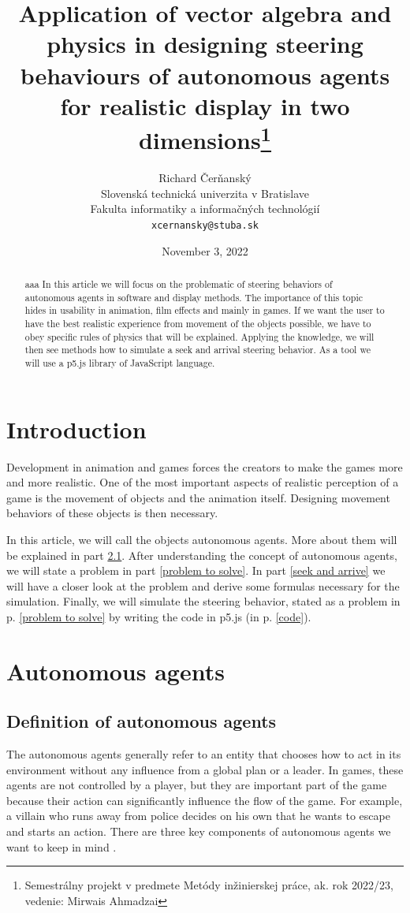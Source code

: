 \documentclass[10pt,twoside,english,a4paper]{article}
\title{Application of vector algebra and physics in designing steering behaviours of autonomous agents for realistic display in two dimensions\thanks{Semestrálny projekt v predmete Metódy inžinierskej práce, ak. rok 2022/23, vedenie: Mirwais Ahmadzai}}
\author{Richard Čerňanský\\[2pt]
	{\small Slovenská technická univerzita v Bratislave}\\
	{\small Fakulta informatiky a informačných technológií}\\
	{\small \texttt{xcernansky@stuba.sk}}
	}
\date{\small November 3, 2022 }
\begin{document}
\maketitle

\begin{abstract}
aaa
In this article we will focus on the problematic of steering behaviors of autonomous agents in software and display methods. The importance of this topic hides in usability in animation, film effects and mainly in games. If we want the user to have the best realistic experience from movement of the objects possible, we have to obey specific rules of physics that will be explained. Applying the knowledge, we will then see methods how to simulate a seek and arrival steering behavior. As a tool we will use a p5.js library of JavaScript language.

\end{abstract}

\section{Introduction}

Development in animation and games forces the creators to make the games more and more realistic. One of the most important aspects of realistic perception of a game is the movement of objects and the animation itself. Designing movement behaviors of these objects is then necessary. 

In this article, we will call the objects autonomous agents. More about them will be explained in part \ref{definition of a.a.}. After understanding the concept of autonomous agents, we will state a problem in part \ref{problem to solve}. In part \ref{seek and arrive} we will have a closer look at the problem and derive some formulas necessary for the simulation. Finally, we will simulate the steering behavior, stated as a problem in p. \ref{problem to solve} by writing the code in p5.js (in p. \ref{code}).

\section{Autonomous agents} \label{autonomous agents}

\subsection{Definition of autonomous agents} \label{definition of a.a.}

The autonomous agents generally refer to an entity that chooses how to act in its environment without any influence from a global plan or a leader. In games, these agents are not controlled by a player, but they are important part of the game because their action can significantly influence the flow of the game. For example, a villain who runs away from police decides on his own that he wants to escape and starts an action. There are three key components of autonomous agents we want to keep in mind \cite{Verhagen}. 
\end{document}
